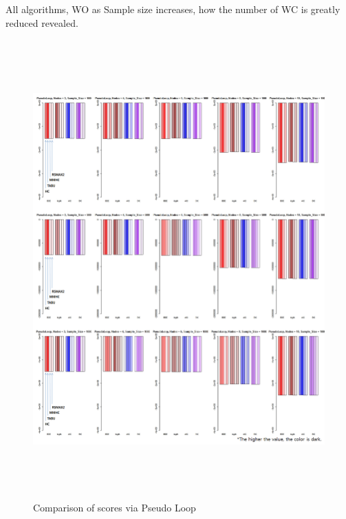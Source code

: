 All algorithms, WO as Sample size increases, how the number of WC is greatly reduced revealed.
	
	\begin{figure}[p]
	\centering
		\includegraphics[height=500pt]{04_PseudoLoop_Score}
		\caption{Comparison of scores via Pseudo Loop}
	\end{figure}	

